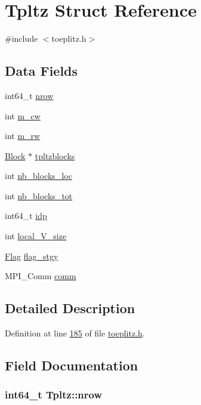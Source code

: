 \hypertarget{structTpltz}{\section{Tpltz Struct Reference}
\label{structTpltz}
}


{\ttfamily \#include $<$toeplitz.\-h$>$}

\subsection*{Data Fields}
\begin{DoxyCompactItemize}
\item 
int64\-\_\-t \hyperlink{structTpltz_ae6401204807b06471ae4cf9ce7c2022b}{nrow}
\item 
int \hyperlink{structTpltz_a6025c0048255a299edfb4f88ca01e7ec}{m\-\_\-cw}
\item 
int \hyperlink{structTpltz_a0ad1c2bba1b44cc8e1a700813195d0a0}{m\-\_\-rw}
\item 
\hyperlink{structBlock}{Block} $\ast$ \hyperlink{structTpltz_ae2ec369f6eaac15a2353231b50270990}{tpltzblocks}
\item 
int \hyperlink{structTpltz_a4090e9931928ca56b30db246ff77ce29}{nb\-\_\-blocks\-\_\-loc}
\item 
int \hyperlink{structTpltz_a6275c3f32f3d790d92a7c8f257d3dcf9}{nb\-\_\-blocks\-\_\-tot}
\item 
int64\-\_\-t \hyperlink{structTpltz_af669b52bd5c07d8e41b4dddfc8c62312}{idp}
\item 
int \hyperlink{structTpltz_a03c363fb09ce439bcbbe0fd1f419ff3a}{local\-\_\-\-V\-\_\-size}
\item 
\hyperlink{structFlag}{Flag} \hyperlink{structTpltz_af136a7cb103383ffab2080c566b8c7ab}{flag\-\_\-stgy}
\item 
M\-P\-I\-\_\-\-Comm \hyperlink{structTpltz_ac000d7cb5fa8d9a204a38255e5d00098}{comm}
\end{DoxyCompactItemize}


\subsection{Detailed Description}


Definition at line \hyperlink{toeplitz_8h_source_l00185}{185} of file \hyperlink{toeplitz_8h_source}{toeplitz.\-h}.



\subsection{Field Documentation}
\hypertarget{structTpltz_ae6401204807b06471ae4cf9ce7c2022b}{
\subsubsection[{nrow}]{\setlength{\rightskip}{0pt plus 5cm}int64\-\_\-t Tpltz\-::nrow}}\label{structTpltz_ae6401204807b06471ae4cf9ce7c2022b}


